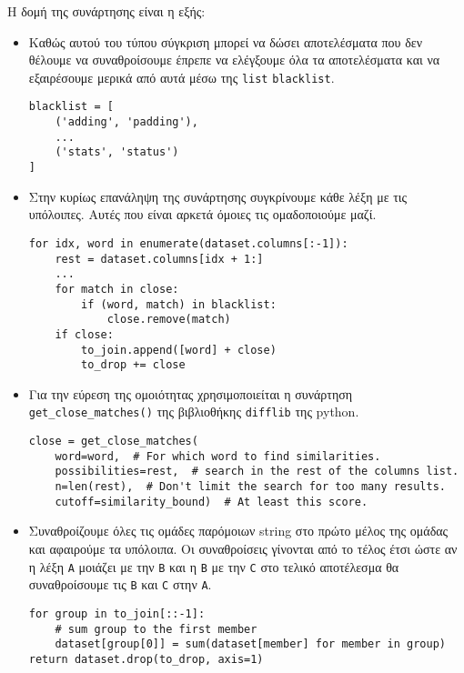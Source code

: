 Η δομή της συνάρτησης είναι η εξής:
\begin{itemize}
\item Καθώς αυτού του τύπου σύγκριση μπορεί να δώσει αποτελέσματα που δεν θέλουμε να συναθροίσουμε έπρεπε να ελέγξουμε όλα τα αποτελέσματα
και να εξαιρέσουμε μερικά από αυτά μέσω της \lstinline!list! \lstinline!blacklist!.
\begin{lstlisting}[captionpos=none, numbers=none, breaklines=true]
blacklist = [
    ('adding', 'padding'),
    ...
    ('stats', 'status')
]
\end{lstlisting}

\item Στην κυρίως επανάληψη της συνάρτησης συγκρίνουμε κάθε λέξη με τις υπόλοιπες.
Αυτές που είναι αρκετά όμοιες τις ομαδοποιούμε μαζί.
\begin{lstlisting}[captionpos=none, numbers=none, breaklines=true]
for idx, word in enumerate(dataset.columns[:-1]):
    rest = dataset.columns[idx + 1:]
    ...
    for match in close:
        if (word, match) in blacklist:
            close.remove(match)
    if close:
        to_join.append([word] + close)
        to_drop += close
\end{lstlisting}

\item Για την εύρεση της ομοιότητας χρησιμοποιείται η συνάρτηση \lstinline!get_close_matches()! της βιβλιοθήκης \lstinline!difflib! της python.
\begin{lstlisting}[captionpos=none, numbers=none, breaklines=true]
close = get_close_matches(
    word=word,  # For which word to find similarities.
    possibilities=rest,  # search in the rest of the columns list.
    n=len(rest),  # Don't limit the search for too many results.
    cutoff=similarity_bound)  # At least this score.
\end{lstlisting}

\item Συναθροίζουμε όλες τις ομάδες παρόμοιων string στο πρώτο μέλος της ομάδας και αφαιρούμε τα υπόλοιπα.
Οι συναθροίσεις γίνονται από το τέλος έτσι ώστε αν
η λέξη \texttt{A} μοιάζει με την \texttt{B} και η \texttt{B} με την \texttt{C} στο τελικό αποτέλεσμα θα
συναθροίσουμε τις \texttt{B} και \texttt{C} στην \texttt{A}.
\begin{lstlisting}[captionpos=none, numbers=none, breaklines=true]
for group in to_join[::-1]:
    # sum group to the first member
    dataset[group[0]] = sum(dataset[member] for member in group)
return dataset.drop(to_drop, axis=1)
\end{lstlisting}
\end{itemize}


